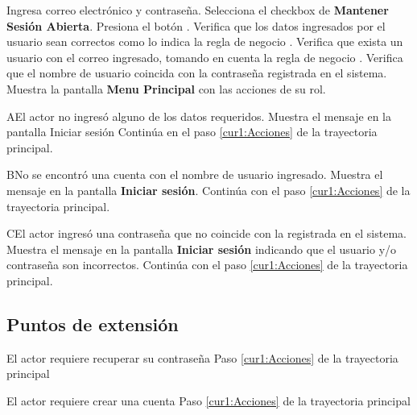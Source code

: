  \begin{UCtrayectoria}
 	
 	\UCpaso [\UCactor] Ingresa correo electrónico y contraseña.
 	\UCpaso [\UCactor] Selecciona el checkbox de \textbf{Mantener Sesión Abierta}.
 	\UCpaso [\UCactor] Presiona el botón .
 	\UCpaso [\UCsist] Verifica que los datos ingresados por el usuario sean correctos como lo indica la regla de negocio . 
 	\UCpaso[\UCsist] Verifica que exista un usuario con el correo ingresado, tomando en cuenta la regla de negocio .  
 	\UCpaso[\UCsist] Verifica que el nombre de usuario coincida con la contraseña registrada en el sistema. 
 	\UCpaso[\UCsist] Muestra la pantalla \textbf{Menu Principal} con las acciones de su rol.
 	
    
 \end{UCtrayectoria}

 \begin{UCtrayectoriaA}{A}{El actor no ingresó alguno de los datos requeridos.}
    \UCpaso[\UCsist] Muestra el mensaje  en la pantalla \textbf{}{Iniciar sesión}
   \UCpaso[] Continúa en el paso \ref{cur1:Acciones} de la trayectoria principal.
 \end{UCtrayectoriaA}
 
 \begin{UCtrayectoriaA}{B}{No se encontró una cuenta con el nombre de usuario ingresado.}
    \UCpaso[\UCsist] Muestra el mensaje  en la pantalla \textbf{Iniciar sesión}.
    \UCpaso[] Continúa con el paso \ref{cur1:Acciones} de la trayectoria principal.
 \end{UCtrayectoriaA}
 
 \begin{UCtrayectoriaA}{C}{El actor ingresó una contraseña que no coincide con la registrada en el sistema.}
    \UCpaso[\UCsist] Muestra el mensaje  en la pantalla \textbf{Iniciar sesión} indicando que el usuario y/o contraseña son incorrectos.
    \UCpaso[] Continúa con el paso \ref{cur1:Acciones} de la trayectoria principal.
 \end{UCtrayectoriaA} 


 
\subsection{Puntos de extensión}

\UCExtensionPoint
{El actor requiere recuperar su contraseña}
{ Paso \ref{cur1:Acciones} de la trayectoria principal}
{}

\UCExtensionPoint
{El actor requiere crear una cuenta}
{ Paso \ref{cur1:Acciones} de la trayectoria principal}
{}
 

